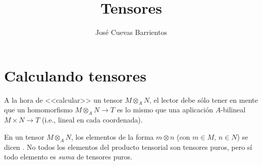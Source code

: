 \documentclass[11pt, reqno]{amsart}
\title{Tensores}
\date{\DTMdate{2025-05-29}}
\author{José Cuevas Barrientos}
\begin{document}
\maketitle

\nocite{aluffi:algebra}
\nocite{atiyah:commutative}

\section{Calculando tensores}
A la hora de <<calcular>> un tensor $M \otimes_A N$, el lector debe sólo tener en mente que un homomorfismo $M \otimes_A
N \to T$ es lo mismo que una aplicación $A$-bilineal $M \times N \to T$ (i.e., lineal en cada coordenada).

En un tensor $M \otimes_A N$, los elementos de la forma $m \otimes n$ (con $m \in M$, $n\in N$) se dicen .
No todos los elementos del producto tensorial son tensores puros, pero sí todo elemento es \emph{suma} de tensores puros.
\end{document}
